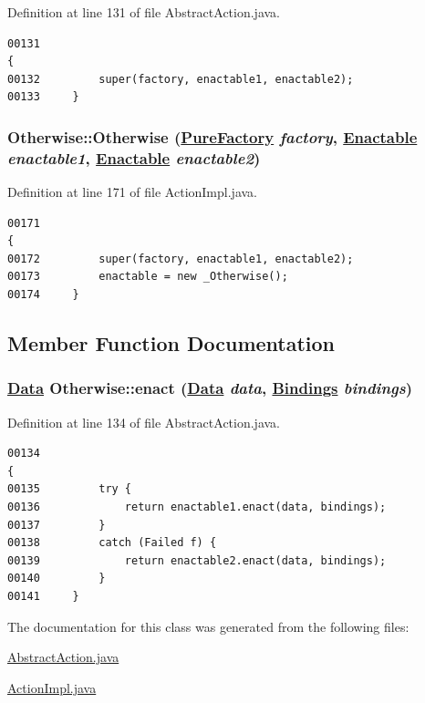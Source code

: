 Definition at line 131 of file Abstract\-Action.java.\footnotesize\begin{verbatim}00131                                                                                       {
00132         super(factory, enactable1, enactable2);
00133     }
\end{verbatim}\normalsize 
\hypertarget{classOtherwise_a2}{
\subsubsection[Otherwise]{\setlength{\rightskip}{0pt plus 5cm}Otherwise::Otherwise (\hyperlink{classPureFactory}{Pure\-Factory} {\em factory}, \hyperlink{interfaceEnactable}{Enactable} {\em enactable1}, \hyperlink{interfaceEnactable}{Enactable} {\em enactable2})}}
\label{classOtherwise_a2}




Definition at line 171 of file Action\-Impl.java.\footnotesize\begin{verbatim}00171                                                                                       {
00172         super(factory, enactable1, enactable2);
00173         enactable = new _Otherwise();
00174     }
\end{verbatim}\normalsize 


\subsection{Member Function Documentation}
\hypertarget{classOtherwise_a1}{
\subsubsection[enact]{\setlength{\rightskip}{0pt plus 5cm}\hyperlink{interfaceData}{Data} Otherwise::enact (\hyperlink{interfaceData}{Data} {\em data}, \hyperlink{interfaceBindings}{Bindings} {\em bindings})}}
\label{classOtherwise_a1}




Definition at line 134 of file Abstract\-Action.java.\footnotesize\begin{verbatim}00134                                                                                {
00135         try {
00136             return enactable1.enact(data, bindings);
00137         }
00138         catch (Failed f) {
00139             return enactable2.enact(data, bindings);
00140         }
00141     }
\end{verbatim}\normalsize 


The documentation for this class was generated from the following files:\begin{CompactItemize}
\item 
\hyperlink{AbstractAction_8java-source}{Abstract\-Action.java}\item 
\hyperlink{ActionImpl_8java-source}{Action\-Impl.java}\end{CompactItemize}
